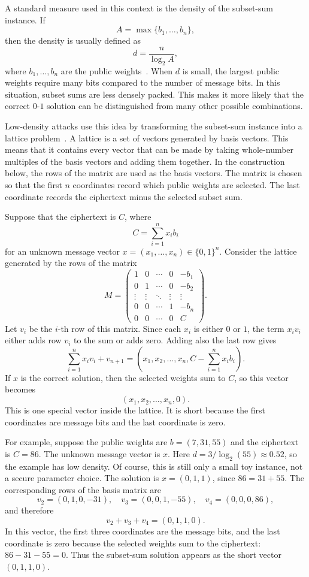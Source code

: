A standard measure used in this context is the density of the subset-sum
instance. If
\[
    A=\max\{b_1,\dots,b_n\},
\]
then the density is usually defined as
\[
    d=\frac{n}{\log_2 A},
\]
where \(b_1,\dots,b_n\) are the public weights~\cite{LagariasOdlyzko1985}. When
\(d\) is small, the largest public weights require many bits compared to the
number of message bits. In this situation, subset sums are less densely packed.
This makes it more likely that the correct \(0\)-\(1\) solution can be
distinguished from many other possible combinations.

Low-density attacks use this idea by transforming the subset-sum instance into
a lattice problem~\cite{LagariasOdlyzko1985}. A lattice is a set of vectors
generated by basis vectors. This means that it contains every vector that can be
made by taking whole-number multiples of the basis vectors and adding them
together. In the construction below, the rows of the matrix are used as the
basis vectors. The matrix is chosen so that the first \(n\) coordinates record
which public weights are selected. The last coordinate records the ciphertext
minus the selected subset sum.

Suppose that the ciphertext
is \(C\), where
\[
    C=\sum_{i=1}^{n} x_i b_i
\]
for an unknown message vector \(x=(x_1,\dots,x_n)\in\{0,1\}^n\). Consider the
lattice generated by the rows of the matrix
\[
    M=
    \begin{pmatrix}
        1 & 0 & \cdots & 0 & -b_1\\
        0 & 1 & \cdots & 0 & -b_2\\
        \vdots & \vdots & \ddots & \vdots & \vdots\\
        0 & 0 & \cdots & 1 & -b_n\\
        0 & 0 & \cdots & 0 & C
    \end{pmatrix}.
\]
Let \(v_i\) be the \(i\)-th row of this matrix. Since each \(x_i\) is either
\(0\) or \(1\), the term \(x_i v_i\) either adds row \(v_i\) to the sum or adds
zero. Adding also the last row gives
\[
    \sum_{i=1}^{n} x_i v_i + v_{n+1}
    =
    (x_1,x_2,\dots,x_n, C-\sum_{i=1}^{n}x_i b_i).
\]
If \(x\) is the correct solution, then the selected weights sum to \(C\), so
this vector becomes
\[
    (x_1,x_2,\dots,x_n,0).
\]
This is one special vector inside the lattice. It is short because the first
coordinates are message bits and the last coordinate is zero.

For example, suppose the public weights are \(b=(7,31,55)\) and the ciphertext
is \(C=86\). The unknown message vector is \(x\). Here
\(d=3/\log_2(55)\approx 0.52\), so the example has low density. Of course,
this is still only a small toy instance, not a secure parameter choice. The solution is
\(x=(0,1,1)\), since \(86=31+55\). The corresponding rows of the basis matrix are
\[
    v_2=(0,1,0,-31),\quad v_3=(0,0,1,-55),\quad v_4=(0,0,0,86),
\]
and therefore
\[
    v_2+v_3+v_4=(0,1,1,0).
\]
In this vector, the first three coordinates are the message bits, and the last
coordinate is zero because the selected weights sum to the ciphertext:
\(86-31-55=0\). Thus the subset-sum solution appears as the short vector
\((0,1,1,0)\).

